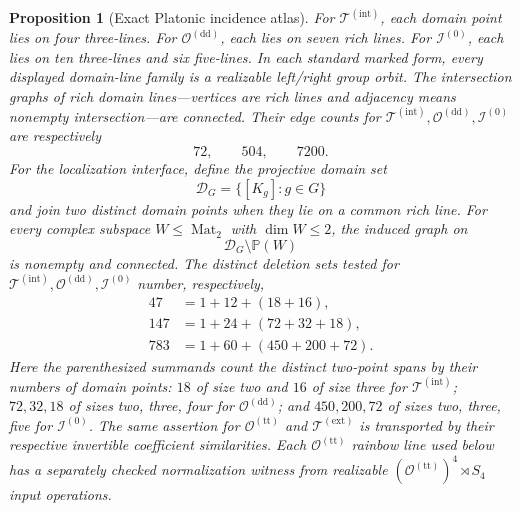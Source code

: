 \documentclass[11pt,letterpaper,onecolumn]{article}
\theoremstyle{plain}
\newtheorem{proposition}[proposition]{Proposition}
\theoremstyle{definition}
\theoremstyle{remark}
\newcommand{\TetInt}{{\mathcal T^{(\mathrm{int})}}}
\newcommand{\TetExt}{{\mathcal T^{(\mathrm{ext})}}}
\newcommand{\OctDD}{{\mathcal O^{(\mathrm{dd})}}}
\newcommand{\OctTT}{{\mathcal O^{(\mathrm{tt})}}}
\newcommand{\IcoZero}{{\mathcal I^{(0)}}}
\newcommand{\Mat}{\operatorname{Mat}}
\begin{document}
\begin{proposition}[Exact Platonic incidence atlas]
For \(\TetInt\), each domain point lies on four three-lines.  For
\(\OctDD\), each lies on seven rich lines.  For \(\IcoZero\), each
lies on ten three-lines and six five-lines.  In each standard marked form,
every displayed domain-line family is a realizable left/right group orbit.
The intersection graphs of rich domain lines---vertices are rich lines and adjacency means nonempty intersection---are connected. Their edge
counts for \(\TetInt,\OctDD,\IcoZero\) are respectively
\hypertarget{eq:cert-platonic-cross-line-edges}{}
\begin{equation*}
  72,\qquad 504,\qquad 7200.
\end{equation*}
For the localization interface, define the projective domain set
\[
 \mathcal D_G=\{[K_g]:g\in G\}
\]
and join two distinct domain points when they lie on a common rich line.  For every complex subspace \(W\le\Mat_2\) with \(\dim W\le2\), the
induced graph on
\begin{equation}
 \mathcal D_G\setminus\mathbb P(W)
 \label{eq:cert-platonic-kernel-deleted-graph}
\end{equation}
is nonempty and connected.  The distinct deletion sets tested for
\(\TetInt,\OctDD,\IcoZero\) number, respectively,
\begin{equation}
 \begin{aligned}
  47&=1+12+(18+16),\\
 147&=1+24+(72+32+18),\\
 783&=1+60+(450+200+72).
 \end{aligned}
 \label{eq:cert-platonic-kernel-deletion-counts}
\end{equation}
Here the parenthesized summands count the distinct two-point spans by their
numbers of domain points: \(18\) of size two and \(16\) of size three for
\(\TetInt\); \(72,32,18\) of sizes two, three, four for
\(\OctDD\); and \(450,200,72\) of sizes two, three, five for
\(\IcoZero\).  The same assertion for \(\OctTT\) and
\(\TetExt\) is transported by their respective invertible
coefficient similarities.  Each \(\OctTT\) rainbow line
used below has a separately checked normalization witness
from realizable \((\OctTT)^4\rtimes S_4\) input operations.


\end{proposition}
\end{document}
